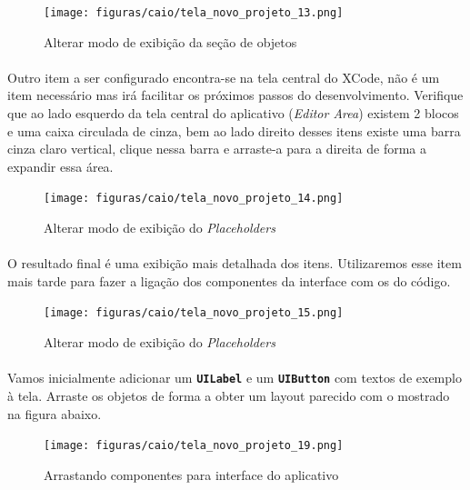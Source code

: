 \documentclass[a4paper,12pt,brazil,doubleside]{book}
\begin{document}
\begin{singlespace}
\begin{figure}[H]
  \centering
  \texttt{[image: figuras/caio/tela\_novo\_projeto\_13.png]}
  \caption{Alterar modo de exibição da seção de objetos}
  \label{fig:a}
\end{figure}

\paragraph{}Outro item a ser configurado encontra-se na tela central do XCode, não é um item necessário mas irá facilitar os próximos passos do desenvolvimento. Verifique que ao lado esquerdo da tela central do aplicativo (\emph{Editor Area}) existem 2 blocos e uma caixa circulada de cinza, bem ao lado direito desses itens existe uma barra cinza claro vertical, clique nessa barra e arraste-a para a direita de forma a expandir essa área.

\begin{figure}[H]
  \centering
  \texttt{[image: figuras/caio/tela\_novo\_projeto\_14.png]}
  \caption{Alterar modo de exibição do \emph{Placeholders}}
  \label{fig:a}
\end{figure}

\paragraph{}O resultado final é uma exibição mais detalhada dos itens. Utilizaremos esse item mais tarde para fazer a ligação dos componentes da interface com os do código.

\begin{figure}[H]
  \centering
  \texttt{[image: figuras/caio/tela\_novo\_projeto\_15.png]}
  \caption{Alterar modo de exibição do \emph{Placeholders}}
  \label{fig:a}
\end{figure}


\paragraph{}Vamos inicialmente adicionar um \texttt{\textbf{UILabel}} e um \texttt{\textbf{UIButton}} com textos de exemplo à tela. Arraste os objetos de forma a obter um layout parecido com o mostrado na figura abaixo.

\begin{figure}[H]
  \centering
  \texttt{[image: figuras/caio/tela\_novo\_projeto\_19.png]}
  \caption{Arrastando componentes para interface do aplicativo}
  \label{fig:a}
\end{figure}


\end{singlespace}
\end{document}
